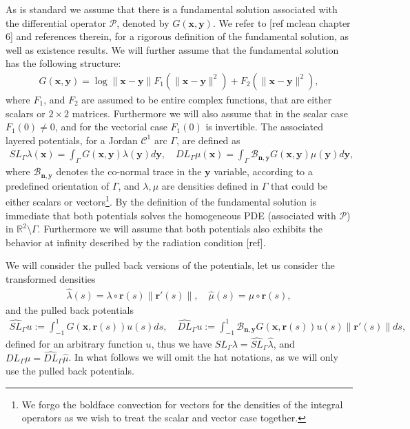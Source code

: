 \documentclass{article}
\newcommand{\vx}{\bm{x}}
\newcommand{\todo}[1]{{\color{red}[#1]}}
\newcommand{\IR}{{\mathbb R}}
\newcommand{\cP}{\mathcal{P}}
\newcommand{\bn}{\bm{n}}
\newcommand{\br}{\bm{r}}
\newcommand{\bx}{\bm{x}}
\newcommand{\by}{\bm{y}}
\begin{document}
As is standard we assume that there is a fundamental solution associated with the differential operator $\cP$, denoted by $G(\vx,\by)$. We refer to \todo{ref mclean chapter 6} and references therein, for a rigorous definition of the fundamental solution, as well as existence results. We will further assume that the fundamental solution has the following structure:
\begin{align}
\label{eq:funsolgen}
G(\bx,\by )  =
\log \|\bx -\by \| F_1(\|\bx -\by \| ^2)+F_2(\|\bx -\by \| ^2),
\end{align}
where $F_1$, and $F_2$ are assumed to be entire complex functions, that are either scalars or $2 \times 2$ matrices. Furthermore we will also assume that in the scalar case $F_1(0) \neq 0$, and for the vectorial case $F_1(0)$ is invertible. The associated layered potentials, for a Jordan $\mathcal{C}^1$ arc $\Gamma$, are defined as 
\begin{align*}
SL_\Gamma \lambda(\bx) = \int_\Gamma G(\bx,\by) \lambda(\by) d\by, \quad DL_\Gamma \mu(\bx) = \int_\Gamma \mathcal{B}_{\bn,\by} G(\bx,\by) \mu(\by) d\by,
\end{align*} 
where $\mathcal{B}_{\bn,\by}$ denotes the co-normal trace in the $\by$ variable, according to a predefined orientation of $\Gamma$, and $\lambda, \mu$ are densities defined in $\Gamma$ that could be either scalars or vectors\footnote{We forgo the boldface convection for vectors for the densities of the integral operators as we wish to treat the scalar and vector case together.}. By the definition of the fundamental solution is immediate that both potentials solves the homogeneous PDE (associated with $\cP$) in $\IR^2 \setminus \Gamma$. Furthermore we will assume that both potentials also exhibits the behavior at infinity described by the radiation condition \todo{ref}. 

We will consider the pulled back versions of the potentials, let us consider the transformed densities 
\begin{align*}
\widehat{\lambda} (s) = \lambda \circ \br(s)  \| \br'(s) \|, \quad 
\widehat{\mu} (s) = \mu \circ \br(s),
\end{align*}
and the pulled back potentials 
\begin{align*}
\widehat{SL}_{\Gamma} u := \int_{-1}^1 
 G(\bx,\br(s))  u(s) ds, \quad 
 \widehat{DL}_{\Gamma} u := \int_{-1}^1 
 \mathcal{B}_{\bn,\by}G(\bx,\br(s))  u(s) \|\br'(s)\|ds,
\end{align*}
defined for an arbitrary function $u$, thus we have $SL_\Gamma \lambda  = \widehat{SL}_\Gamma \widehat{\lambda}$, and $DL_\Gamma \mu  = \widehat{DL}_\Gamma \widehat{\mu}$. In what follows we will omit the hat notations, as we will only use the pulled back potentials. 
\end{document}
